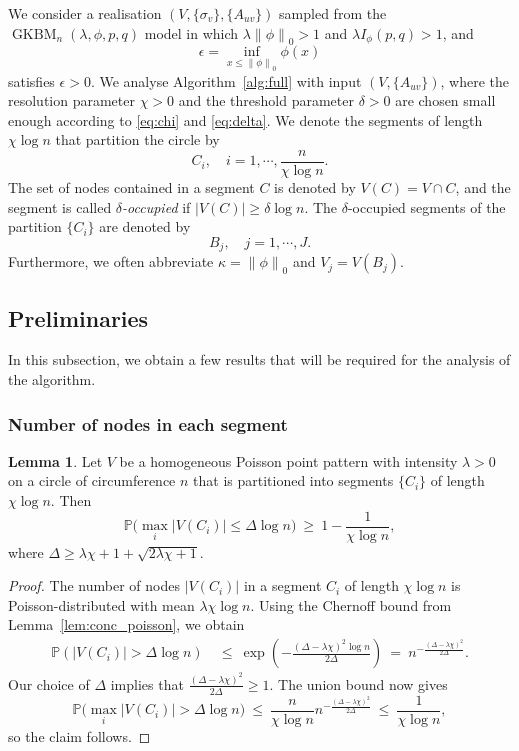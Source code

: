 \documentclass[letterpaper,11pt]{article}
\newtheorem{lem}[thm]{Lemma}
\theoremstyle{definition}
\def\P{\mathbb{P}}
\def\weq{ \ = \ }
\def\wge{ \ \ge \ }
\def\wle{ \ \le \ }
\newcommand{\abs}[1]{{\lvert#1\rvert}}
\newcommand{\zeronorm}[1]{{\lVert#1\rVert}_0}
\numberwithin{equation}{section}
\newcommand{\GKBM}{\operatorname{GKBM}}
\newcommand{\de}{\delta}
\newcommand{\De}{\Delta}
\newcommand{\eps}{\epsilon}
\newcommand{\ka}{\kappa}
\newcommand{\la}{\lambda}
\newtheorem{lem}[thm]{Lemma}
\theoremstyle{definition}
\def\P{\mathbb{P}}
\def\weq{ \ = \ }
\def\wge{ \ \ge \ }
\def\wle{ \ \le \ }
\newcommand{\abs}[1]{{\lvert#1\rvert}}
\newcommand{\zeronorm}[1]{{\lVert#1\rVert}_0}
\numberwithin{equation}{section}
\newcommand{\GKBM}{\operatorname{GKBM}}
\newcommand{\de}{\delta}
\newcommand{\De}{\Delta}
\newcommand{\eps}{\epsilon}
\newcommand{\ka}{\kappa}
\newcommand{\la}{\lambda}
\theoremstyle{thmstyletwo}%
\begin{document}
We consider a realisation $(V, \{\sigma_v\}, \{A_{uv}\})$ sampled from the $\GKBM_n(\la, \phi, p, q)$ model in which
$\la \zeronorm{\phi} > 1$ and $\la I_\phi(p,q) > 1$, and 
\[
 \eps = \inf_{x \le \zeronorm{\phi}} \phi(x)
\] 
satisfies $\eps > 0$. We analyse Algorithm~\ref{alg:full} with input $(V, \{A_{uv}\})$,
where the resolution parameter $\chi > 0$
and the threshold parameter $\de > 0$ are chosen small enough according to \eqref{eq:chi} and \eqref{eq:delta}.
We denote the segments of length $\chi\log n$ that partition the circle by
\[
 C_i, \quad i=1,\cdots,\frac{n}{\chi \log n}.
\]
The set of nodes contained in a segment $C$ is denoted by $V(C) = V \cap C$, and
the segment is called \emph{$\de$-occupied} if $|V(C)| \ge \de \log n$.
The $\de$-occupied segments of the partition $\{C_i\}$ are denoted by
\[
 B_j, \quad j = 1,\cdots, J.
\]
Furthermore, we often abbreviate $\ka = \zeronorm{\phi}$ and $V_j = V(B_j)$.


\subsection{Preliminaries}

In this subsection, we obtain a few results that will be required for the analysis of the algorithm.


\subsubsection{Number of nodes in each segment}

\begin{lem}
\label{lem:max_nodes}
Let $V$ be a homogeneous Poisson point pattern with intensity $\la > 0$
on a circle of circumference $n$ that is partitioned into segments $\{C_i\}$
of length $\chi \log n$.
Then
\[
 \P \Big( \max_i \abs{V(C_i)} \le \De \log n \Big)
 \wge 1 - \frac{1}{\chi \log n},
\]
where $\De \ge \la\chi+1 + \sqrt{2\la\chi+1}$.
\end{lem}
\begin{proof}
The number of nodes $|V(C_i)|$ in a segment $C_i$ of length $\chi \log n$
is Poisson-distributed with mean $\la \chi \log n$.
Using the Chernoff bound from Lemma~\ref{lem:conc_poisson}, we obtain
\begin{align*}
 \P(|V(C_i)| > \Delta \log n )
 &\wle \exp \left(-\frac{(\Delta-\la \chi)^2\log n}{2\Delta}\right)
 \weq n^{- \frac{(\Delta-\la \chi)^2  }{2\Delta}}.
\end{align*}
Our choice of $\De$ implies that $\frac{(\Delta-\la \chi)^2  }{2\Delta} \ge 1$.
The union bound now gives
\[
 \P \Big( \max_i \abs{V(C_i)} > \De \log n \Big)
 \wle \frac{n}{\chi \log n} n^{- \frac{(\Delta-\la \chi)^2  }{2\Delta}}
 \wle \frac{1}{\chi \log n},
\]
so the claim follows.
\end{proof}
\end{document}
